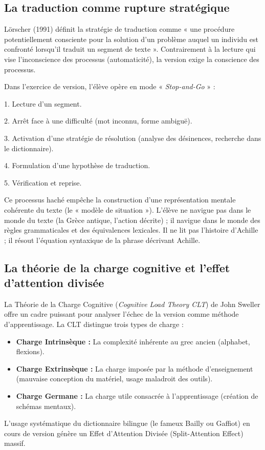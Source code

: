\subsection{La traduction comme rupture stratégique}

Lörscher (1991) définit la stratégie de traduction comme « une procédure potentiellement consciente
pour la solution d'un problème auquel un individu est confronté lorsqu'il traduit un segment de
texte ».\cite{II-3-1-ref31} Contrairement à la lecture qui vise l'inconscience des processus
(automaticité), la version exige la conscience des processus.

Dans l'exercice de version, l'élève opère en mode « \textit{Stop-and-Go} » :

1. Lecture d'un segment.

2. Arrêt face à une difficulté (mot inconnu, forme ambiguë).

3. Activation d'une stratégie de résolution (analyse des désinences, recherche dans le
dictionnaire).

4. Formulation d'une hypothèse de traduction.

5. Vérification et reprise.\cite{II-3-1-ref4}

Ce processus haché empêche la construction d'une représentation mentale cohérente du texte (le «
modèle de situation »). L'élève ne navigue pas dans le monde du texte (la Grèce antique, l'action
décrite) ; il navigue dans le monde des règles grammaticales et des équivalences lexicales. Il ne
lit pas l'histoire d'Achille ; il résout l'équation syntaxique de la phrase décrivant Achille.



\subsection{La théorie de la charge cognitive et l'effet d'attention divisée}

La Théorie de la Charge Cognitive (\textit{Cognitive Load Theory \- CLT}) de John Sweller offre un
cadre puissant pour analyser l'échec de la version comme méthode d'apprentissage.\cite{II-3-1-ref6}
La CLT distingue trois types de charge :

\begin{itemize}\item \textbf{Charge Intrinsèque :} La complexité inhérente au grec ancien (alphabet, flexions).\item \textbf{Charge Extrinsèque :} La charge imposée par la méthode d'enseignement (mauvaise conception du matériel, usage maladroit des outils).\item \textbf{Charge Germane :} La charge utile consacrée à l'apprentissage (création de schémas mentaux).\end{itemize}L'usage systématique du dictionnaire bilingue (le fameux Bailly ou Gaffiot) en cours de version
génère un Effet d'Attention Divisée (Split-Attention Effect) massif.\cite{II-3-1-ref35}

